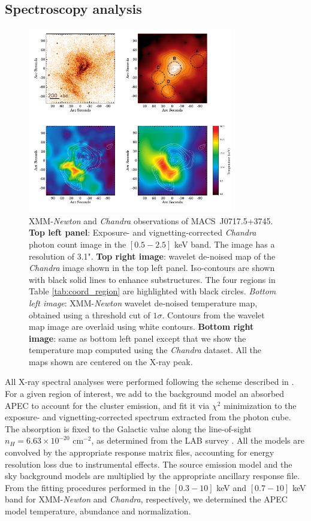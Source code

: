 \documentclass[twocolumn,traditabstract]{aa}
\begin{document}
\subsection{Spectroscopy analysis}\label{sec:Spectroscopy_analysis}
\begin{figure}[h]
\centering
\includegraphics[width=0.8\textwidth]{Figure/MACSJ0717_all_xray_ima.pdf}
\caption{\footnotesize{XMM-\textit{Newton} and \textit{Chandra} observations of \mbox{MACS~J0717.5+3745}. {\bf Top left panel}: Exposure- and vignetting-corrected \textit{Chandra} photon count image in the $[0.5-2.5]$ keV band. The image has a resolution of 3.1". {\bf Top right image}: wavelet de-noised map of the \textit{Chandra} image shown in the top left panel. Iso-contours are shown with black solid lines to enhance substructures. The four regions in Table \ref{tab:coord_region} are highlighted with black circles. \textit{Bottom left image}: XMM-\textit{Newton} wavelet de-noised temperature map, obtained using a threshold cut of $1\sigma$. Contours from the wavelet map image are overlaid using white contours. {\bf Bottom right image}: same as bottom left panel except that we show the temperature map computed using the \textit{Chandra} dataset. All the maps shown are centered on the X-ray peak.}}
\label{fig:Xray_all_maps}
\end{figure}

All X-ray spectral analyses were performed following the scheme described in \cite{bourdin2008}. For a given region of interest, we add to the background model an absorbed APEC to account for the cluster emission, and fit it via $\chi^{2}$ minimization to the exposure- and vignetting-corrected spectrum extracted from the photon cube. The absorption is fixed to the Galactic value along the line-of-sight $n_{H} = 6.63 \times 10^{-20}$ cm$^{-2}$, as determined from the LAB survey \cite{kalberla2005}. All the models are convolved by the appropriate response matrix files, accounting for energy resolution loss due to instrumental effects. The source emission model and the sky background models are multiplied by the appropriate ancillary response file. From the fitting procedures performed in the $[0.3-10]$ keV and $[0.7-10]$ keV band for XMM-\textit{Newton} and \textit{Chandra}, respectively, we determined the APEC model temperature, abundance and normalization. 
\end{document}
